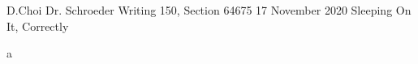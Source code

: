 \documentclass[12pt, letterpaper]{article}
\begin{document}
\begin{mla}
	{D.}{Choi}
	{Dr. Schroeder}
	{Writing 150, Section 64675}
	{17 November 2020}
	{Sleeping On It, Correctly}


a


\begin{workscited}
\end{workscited}


\end{mla}
\end{document}
